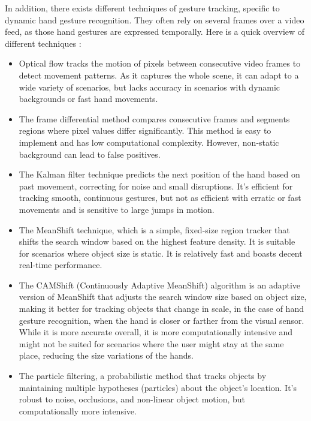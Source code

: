 \documentclass[12pt]{article}
\begin{document}
In addition, there exists different techniques of gesture tracking, specific to dynamic hand gesture recognition. They often rely on several frames over a video feed, as those hand gestures are expressed temporally. Here is a quick overview of different techniques :
\begin{itemize}
  \item Optical flow tracks the motion of pixels between consecutive video frames to detect movement patterns. As it captures the whole scene, it can adapt to a wide variety of scenarios, but lacks accuracy in scenarios with dynamic backgrounds or fast hand movements. 
  \item The frame differential method compares consecutive frames and segments regions where pixel values differ significantly. This method is easy to implement and has low computational complexity. However, non-static background can lead to false positives.
  \item The Kalman filter technique predicts the next position of the hand based on past movement, correcting for noise and small disruptions. It's efficient for tracking smooth, continuous gestures, but not as efficient with erratic or fast movements and is sensitive to large jumps in motion.
  \item The MeanShift technique, which is a simple, fixed-size region tracker that shifts the search window based on the highest feature density. It is suitable for scenarios where object size is static. It is relatively fast and boasts decent real-time performance.
  \item The CAMShift (Continuously Adaptive MeanShift) algorithm is an adaptive version of MeanShift that adjusts the search window size based on object size, making it better for tracking objects that change in scale, in the case of hand gesture recognition, when the hand is closer or farther from the visual sensor. While it is more accurate overall, it is more computationally intensive and might not be suited for scenarios where the user might stay at the same place, reducing the size variations of the hands.
  \item The particle filtering, a probabilistic method that tracks objects by maintaining multiple hypotheses (particles) about the object's location. It's robust to noise, occlusions, and non-linear object motion, but computationally more intensive.
\end{itemize}
\end{document}
